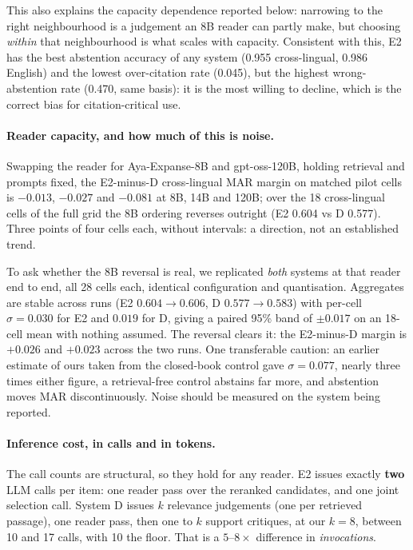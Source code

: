 \documentclass[11pt]{article}
\begin{document}
This also explains the capacity dependence reported below: narrowing to
the right neighbourhood is a judgement an 8B reader can partly make, but choosing
\emph{within} that neighbourhood is what scales with capacity. Consistent with
this, E2 has the best abstention accuracy of any system (0.955 cross-lingual,
0.986 English) and the lowest over-citation rate (0.045), but the highest
wrong-abstention rate (0.470, same basis): it is the most willing to decline, which is the
correct bias for citation-critical use.

\paragraph{Reader capacity, and how much of this is noise.} Swapping the reader
for Aya-Expanse-8B \cite{aya2024expanse} and gpt-oss-120B, holding retrieval and prompts fixed, the
E2-minus-D cross-lingual MAR margin on matched pilot cells is $-0.013$, $-0.027$
and $-0.081$ at 8B, 14B and 120B; over the 18 cross-lingual cells of the full grid the
8B ordering reverses outright (E2 0.604 vs D 0.577). Three points of four cells each, without
intervals: a direction, not an established trend.

To ask whether the 8B reversal is real, we replicated \emph{both} systems at that
reader end to end, all 28 cells each, identical configuration and quantisation.
Aggregates are stable across runs (E2 $0.604\to0.606$, D $0.577\to0.583$) with
per-cell $\sigma\!=\!0.030$ for E2 and $0.019$ for D, giving a paired 95\% band
of $\pm0.017$ on an 18-cell mean with nothing assumed. The reversal clears it:
the E2-minus-D margin is $+0.026$ and $+0.023$ across the two runs. One
transferable caution: an earlier estimate of ours taken from the closed-book
control gave $\sigma\!=\!0.077$, nearly three times either figure, a
retrieval-free control abstains far more, and abstention moves MAR
discontinuously. Noise should be measured on the system being reported.

\paragraph{Inference cost, in calls and in tokens.} The call counts are
structural, so they hold for any reader. E2 issues exactly \textbf{two} LLM calls
per item: one reader pass over the reranked candidates, and one joint selection
call. System D issues $k$ relevance judgements (one per retrieved passage), one
reader pass, then one to $k$ support critiques, at our $k=8$, between 10 and 17
calls, with 10 the floor. That is a $5$--$8\times$ difference in \emph{invocations}.
\end{document}

